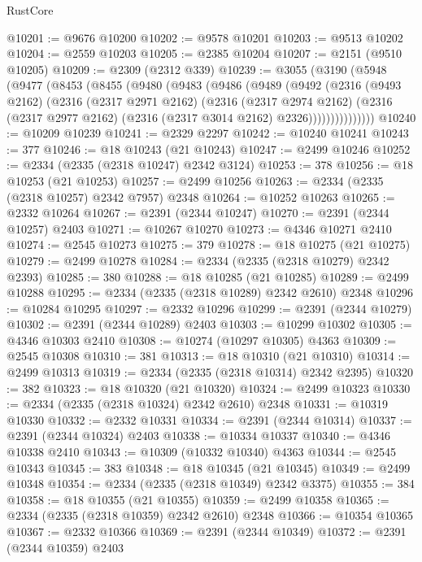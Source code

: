 \begin{lexlean}{RustCore}
\begin{coremodule}
@10201 := @9676 @10200
@10202 := @9578 @10201
@10203 := @9513 @10202
@10204 := @2559 @10203
@10205 := @2385 @10204
@10207 := @2151 (@9510 @10205)
@10209 := @2309 (@2312 @339)
@10239 := @3055
    (@3190
      (@5948
        (@9477
          (@8453
            (@8455
              (@9480
                (@9483
                  (@9486
                    (@9489
                      (@9492
                        (@2316
                          (@9493 @2162)
                          (@2316
                            (@2317 @2971 @2162)
                            (@2316
                              (@2317 @2974 @2162)
                              (@2316
                                (@2317 @2977 @2162)
                                (@2316 (@2317 @3014 @2162) @2326)))))))))))))))
@10240 := @10209 @10239
@10241 := @2329 @2297
@10242 := @10240 @10241
@10243 := 377
@10246 := @18 @10243 (@21 @10243)
@10247 := @2499 @10246
@10252 := @2334 (@2335 (@2318 @10247) @2342 @3124)
@10253 := 378
@10256 := @18 @10253 (@21 @10253)
@10257 := @2499 @10256
@10263 := @2334 (@2335 (@2318 @10257) @2342 @7957) @2348
@10264 := @10252 @10263
@10265 := @2332 @10264
@10267 := @2391 (@2344 @10247)
@10270 := @2391 (@2344 @10257) @2403
@10271 := @10267 @10270
@10273 := @4346 @10271 @2410
@10274 := @2545 @10273
@10275 := 379
@10278 := @18 @10275 (@21 @10275)
@10279 := @2499 @10278
@10284 := @2334 (@2335 (@2318 @10279) @2342 @2393)
@10285 := 380
@10288 := @18 @10285 (@21 @10285)
@10289 := @2499 @10288
@10295 := @2334 (@2335 (@2318 @10289) @2342 @2610) @2348
@10296 := @10284 @10295
@10297 := @2332 @10296
@10299 := @2391 (@2344 @10279)
@10302 := @2391 (@2344 @10289) @2403
@10303 := @10299 @10302
@10305 := @4346 @10303 @2410
@10308 := @10274 (@10297 @10305) @4363
@10309 := @2545 @10308
@10310 := 381
@10313 := @18 @10310 (@21 @10310)
@10314 := @2499 @10313
@10319 := @2334 (@2335 (@2318 @10314) @2342 @2395)
@10320 := 382
@10323 := @18 @10320 (@21 @10320)
@10324 := @2499 @10323
@10330 := @2334 (@2335 (@2318 @10324) @2342 @2610) @2348
@10331 := @10319 @10330
@10332 := @2332 @10331
@10334 := @2391 (@2344 @10314)
@10337 := @2391 (@2344 @10324) @2403
@10338 := @10334 @10337
@10340 := @4346 @10338 @2410
@10343 := @10309 (@10332 @10340) @4363
@10344 := @2545 @10343
@10345 := 383
@10348 := @18 @10345 (@21 @10345)
@10349 := @2499 @10348
@10354 := @2334 (@2335 (@2318 @10349) @2342 @3375)
@10355 := 384
@10358 := @18 @10355 (@21 @10355)
@10359 := @2499 @10358
@10365 := @2334 (@2335 (@2318 @10359) @2342 @2610) @2348
@10366 := @10354 @10365
@10367 := @2332 @10366
@10369 := @2391 (@2344 @10349)
@10372 := @2391 (@2344 @10359) @2403

\end{coremodule}
\end{lexlean}
